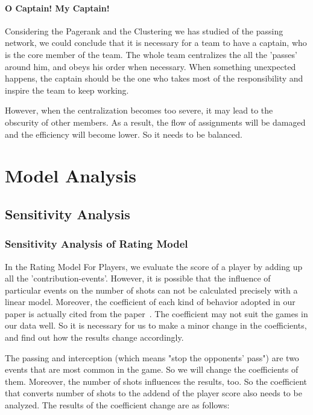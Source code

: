 \documentclass[12pt]{mcmthesis}
\begin{document}
\paragraph{O Captain! My Captain!}
Considering the Pagerank and the Clustering we has studied of the passing network, we could conclude that it is necessary for a team to have a captain, who is the core member of the team. The whole team centralizes the all the 'passes' around him, and obeys his order when necessary. When something unexpected happens, the captain should be the one who takes most of the responsibility and inspire the team to keep working. 

However, when the centralization becomes too severe, it may lead to the obscurity of other members. As a result,  the flow of assignments will be damaged and the efficiency will become lower. So it needs to be balanced.
\section{Model Analysis}
\subsection{Sensitivity Analysis}
\subsubsection{Sensitivity Analysis of Rating Model}
In the Rating Model For Players, we evaluate the score of a player by adding up all the 'contribution-events'. However, it is possible that the influence of particular events on the number of shots can not be calculated precisely with a linear model. Moreover, the coefficient of each kind of behavior adopted in our paper is actually cited from the paper~\cite{development}. The coefficient may not suit the games in our data well. So it is necessary for us to make a minor change in the coefficients, and find out how the results change accordingly. 

The passing and interception (which means "stop the opponents' pass") are two events that are most common in the game. So we will change the coefficients of them. Moreover, the number of shots influences the results, too. So the coefficient that converts number of shots to the addend of the player score also needs to be analyzed. The results of the coefficient change are as follows:
\end{document}
